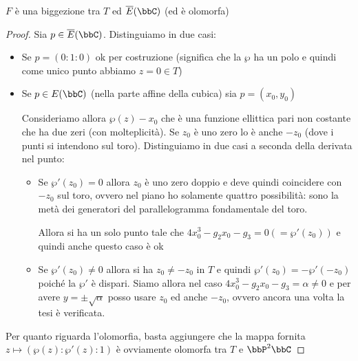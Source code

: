 \begin{proposizione}
  $F$ è una biggezione tra $T$ ed $\ol{E}(\bbC)$ (ed è olomorfa)
\end{proposizione}
\begin{proof}
  Sia $p \in \ol{E}(\bbC)$. Distinguiamo in due casi:
  \begin{itemize}
  \item Se $p = (0 : 1 : 0)$ ok per costruzione (significa che la $\wp$
    ha un polo e quindi come unico punto abbiamo $z = 0 \in T$)
  \item Se $p \in E(\bbC)$ (nella parte affine della cubica) sia $p =
    (x_0, y_0)$

    Consideriamo allora $\wp(z) - x_0$ che è una funzione ellittica pari
    non costante che ha due zeri (con molteplicità). Se $z_0$ è uno zero
    lo è anche $- z_0$ (dove i punti si intendono sul
    toro). Distinguiamo in due casi a seconda della derivata nel punto:
    \begin{itemize}
    \item Se $\wp'(z_0) = 0$ allora $z_0$ è uno zero doppio e deve
      quindi coincidere con $-z_0$ sul toro, ovvero nel piano ho
      solamente quattro possibilità: sono la metà dei generatori del
      parallelogramma fondamentale del toro.
      

      Allora si ha un solo punto tale che $4x_0^3 - g_2 x_0 - g_3 = 0 (=
      \wp'(z_0))$ e quindi anche questo caso è ok
    \item Se $\wp'(z_0) \neq 0$ allora si ha $z_0 \neq - z_0$ in $T$ e
      quindi $\wp'(z_0) = - \wp'(-z_0)$ poiché la $\wp'$ è
      dispari. Siamo allora nel caso $4x_0^3 - g_2 x_0 - g_3 = \alpha
      \neq 0$ e per avere $y = \pm \sqrt{\alpha}$ posso usare $z_0$ ed
      anche $-z_0$, ovvero ancora una volta la tesi è verificata.
    \end{itemize}
  \end{itemize}

  Per quanto riguarda l'olomorfia, basta aggiungere che la mappa fornita
  $z \mapsto (\wp(z) : \wp'(z) : 1)$ è ovviamente olomorfa tra $T$ e
  $\bbP^2 \bbC$
\end{proof}

